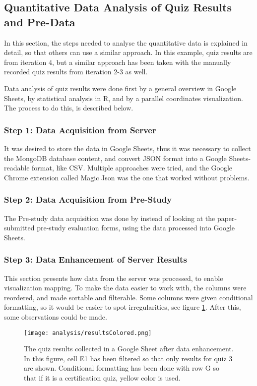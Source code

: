 \subsection{Quantitative Data Analysis of Quiz Results and Pre-Data}

In this section, the steps needed to analyse the quantitative data is explained in detail, so that others can use a similar approach. In this example, quiz results are from iteration 4, but a similar approach has been taken with the manually recorded quiz results from iteration 2-3 as well.

Data analysis of quiz results were done first by a general overview in Google Sheets, by statistical analysis in R, and by a parallel coordinates visualization. The process to do this, is described below.

\subsubsection{Step 1: Data Acquisition from Server}

It was desired to store the data in Google Sheets, thus it was necessary to collect the MongoDB database content, and convert JSON format into a Google Sheets-readable format, like CSV. Multiple approaches were tried, and the Google Chrome extension called Magic Json \citep{agaze} was the one that worked without problems.

\subsubsection{Step 2: Data Acquisition from Pre-Study}

The Pre-study data acquisition was done by instead of looking at the paper-submitted pre-study evaluation forms, using the data processed into Google Sheets.

\subsubsection{Step 3: Data Enhancement of Server Results}

This section presents how data from the server was processed, to enable visualization mapping. To make the data easier to work with, the columns were reordered, and made sortable and filterable. Some columns were given conditional formatting, so it would be easier to spot irregularities, see figure \ref{fig:resultsColored}. After this, some observations could be made.

\begin{figure}[h]
    \centering
    \texttt{[image: analysis/resultsColored.png]}
    \caption{The quiz results collected in a Google Sheet after data enhancement. In this figure, cell E1 has been filtered so that only results for quiz 3 are shown. Conditional formatting has been done with row G so that if it is a certification quiz, yellow color is used.}
    \label{fig:resultsColored}
\end{figure}

